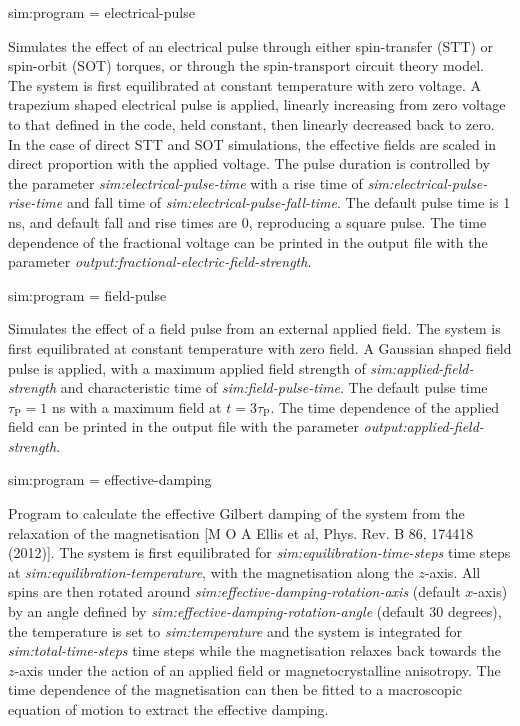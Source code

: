 {\zicf sim:program = electrical-pulse}
Simulates the effect of an electrical pulse through either spin-transfer (STT) or
spin-orbit (SOT) torques, or through the spin-transport circuit theory model. The
system is first equilibrated at constant temperature with zero voltage. A
trapezium shaped electrical pulse is applied, linearly increasing from zero
voltage to that defined in the code, held constant, then linearly decreased back
to zero. In the case of direct STT and SOT simulations, the effective fields are
scaled in direct proportion with the applied voltage. The pulse duration is
controlled by the parameter \textit{sim:electrical-pulse-time}
with a rise time of \textit{sim:electrical-pulse-rise-time} and fall time of
\textit{sim:electrical-pulse-fall-time}. The default pulse time is 1 ns, and
default fall and rise times are 0, reproducing a square pulse. The time
dependence of the fractional voltage can be printed in the output file with the
parameter \textit{output:fractional-electric-field-strength}.

{\zicf sim:program = field-pulse}
Simulates the effect of a field pulse from an external applied field. The
system is first equilibrated at constant temperature with zero field. A
Gaussian shaped field pulse is applied, with a maximum applied field strength of
\textit{sim:applied-field-strength} and characteristic time of
\textit{sim:field-pulse-time}. The default pulse time $\tau_\mathrm{P} = 1$ ns
with a maximum field at $t = 3\tau_\mathrm{P}$. The time dependence of the
applied field can be printed in the output file with the parameter
\textit{output:applied-field-strength}.

{\zicf sim:program = effective-damping}
Program to calculate the effective Gilbert damping of the system from the
relaxation of the magnetisation [M O A Ellis et al, Phys. Rev. B 86, 174418 (2012)].
The system is first equilibrated for \textit{sim:equilibration-time-steps} time
steps at \textit{sim:equilibration-temperature}, with the magnetisation along
the $z$-axis. All spins are then rotated around
\textit{sim:effective-damping-rotation-axis} (default $x$-axis) by an angle
defined by \textit{sim:effective-damping-rotation-angle} (default 30 degrees),
the temperature is set to \textit{sim:temperature} and the system is integrated
for \textit{sim:total-time-steps} time steps while the magnetisation relaxes
back towards the $z$-axis under the action of an applied field or
magnetocrystalline anisotropy. The time dependence of the magnetisation can
then be fitted to a macroscopic equation of motion to extract the effective
damping.

